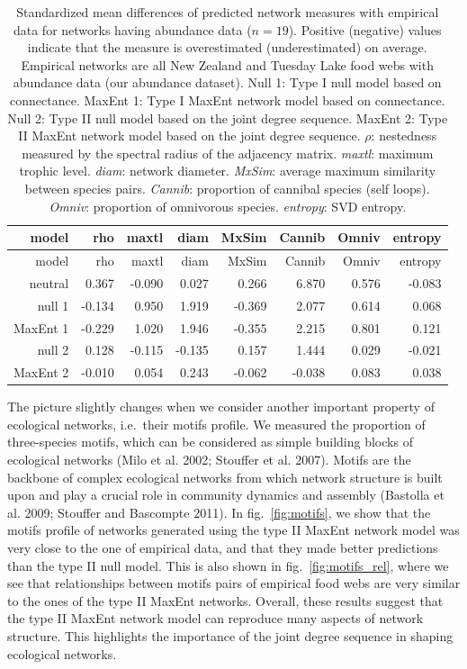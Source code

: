 \documentclass[10pt,oneside]{article}
\begin{document}
\hypertarget{tbl:measures_abund}{}
\begin{longtable}[]{@{}rrrrrrrr@{}}
\caption{\label{tbl:measures_abund}Standardized mean differences of
predicted network measures with empirical data for networks having
abundance data (\(n = 19\)). Positive (negative) values indicate that
the measure is overestimated (underestimated) on average. Empirical
networks are all New Zealand and Tuesday Lake food webs with abundance
data (our abundance dataset). Null 1: Type I null model based on
connectance. MaxEnt 1: Type I MaxEnt network model based on connectance.
Null 2: Type II null model based on the joint degree sequence. MaxEnt 2:
Type II MaxEnt network model based on the joint degree sequence.
\(\rho\): nestedness measured by the spectral radius of the adjacency
matrix. \emph{maxtl}: maximum trophic level. \emph{diam}: network
diameter. \emph{MxSim}: average maximum similarity between species
pairs. \emph{Cannib}: proportion of cannibal species (self loops).
\emph{Omniv}: proportion of omnivorous species. \emph{entropy}: SVD
entropy.}\tabularnewline
\toprule
model & rho & maxtl & diam & MxSim & Cannib & Omniv &
entropy\tabularnewline
\midrule
\endfirsthead
\toprule
model & rho & maxtl & diam & MxSim & Cannib & Omniv &
entropy\tabularnewline
\midrule
\endhead
neutral & 0.367 & -0.090 & 0.027 & 0.266 & 6.870 & 0.576 &
-0.083\tabularnewline
null 1 & -0.134 & 0.950 & 1.919 & -0.369 & 2.077 & 0.614 &
0.068\tabularnewline
MaxEnt 1 & -0.229 & 1.020 & 1.946 & -0.355 & 2.215 & 0.801 &
0.121\tabularnewline
null 2 & 0.128 & -0.115 & -0.135 & 0.157 & 1.444 & 0.029 &
-0.021\tabularnewline
MaxEnt 2 & -0.010 & 0.054 & 0.243 & -0.062 & -0.038 & 0.083 &
0.038\tabularnewline
\bottomrule
\end{longtable}

The picture slightly changes when we consider another important property
of ecological networks, i.e.~their motifs profile. We measured the
proportion of three-species motifs, which can be considered as simple
building blocks of ecological networks (Milo et al. 2002; Stouffer et
al. 2007). Motifs are the backbone of complex ecological networks from
which network structure is built upon and play a crucial role in
community dynamics and assembly (Bastolla et al. 2009; Stouffer and
Bascompte 2011). In fig.~\ref{fig:motifs}, we show that the motifs
profile of networks generated using the type II MaxEnt network model was
very close to the one of empirical data, and that they made better
predictions than the type II null model. This is also shown in
fig.~\ref{fig:motifs_rel}, where we see that relationships between
motifs pairs of empirical food webs are very similar to the ones of the
type II MaxEnt networks. Overall, these results suggest that the type II
MaxEnt network model can reproduce many aspects of network structure.
This highlights the importance of the joint degree sequence in shaping
ecological networks.
\end{document}
